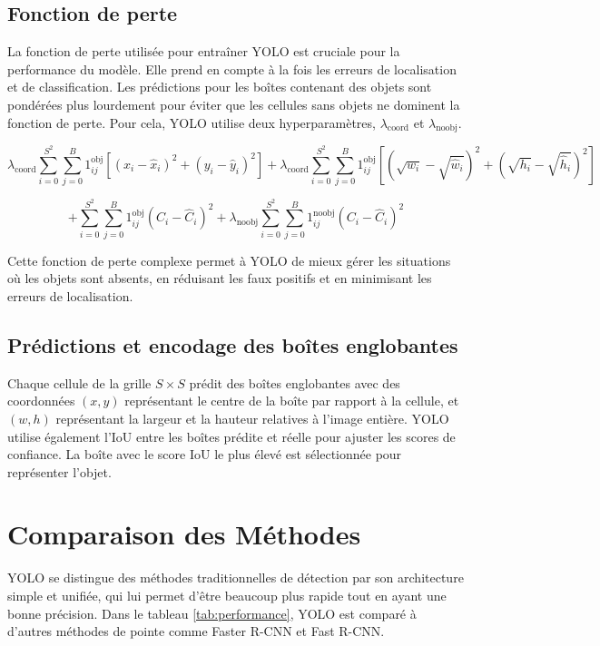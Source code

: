 \documentclass[a4paper,11pt]{article}
\begin{document}
\subsection{Fonction de perte}
La fonction de perte utilisée pour entraîner YOLO est cruciale pour la performance du modèle. Elle prend en compte à la fois les erreurs de localisation et de classification. Les prédictions pour les boîtes contenant des objets sont pondérées plus lourdement pour éviter que les cellules sans objets ne dominent la fonction de perte. Pour cela, YOLO utilise deux hyperparamètres, $\lambda_{\text{coord}}$ et $\lambda_{\text{noobj}}$.

\begin{equation}
\lambda_{\text{coord}} \sum_{i=0}^{S^2} \sum_{j=0}^{B} 1^{\text{obj}}_{ij} \left[(x_i - \hat{x}_i)^2 + (y_i - \hat{y}_i)^2\right] + \lambda_{\text{coord}} \sum_{i=0}^{S^2} \sum_{j=0}^{B} 1^{\text{obj}}_{ij} \left[\left(\sqrt{w_i} - \sqrt{\hat{w}_i}\right)^2 + \left(\sqrt{h_i} - \sqrt{\hat{h}_i}\right)^2 \right]
\end{equation}

\begin{equation}
+ \sum_{i=0}^{S^2} \sum_{j=0}^{B} 1^{\text{obj}}_{ij} \left(C_i - \hat{C}_i\right)^2 + \lambda_{\text{noobj}} \sum_{i=0}^{S^2} \sum_{j=0}^{B} 1^{\text{noobj}}_{ij} \left(C_i - \hat{C}_i\right)^2
\end{equation}

Cette fonction de perte complexe permet à YOLO de mieux gérer les situations où les objets sont absents, en réduisant les faux positifs et en minimisant les erreurs de localisation.

\subsection{Prédictions et encodage des boîtes englobantes}
Chaque cellule de la grille $S \times S$ prédit des boîtes englobantes avec des coordonnées $(x, y)$ représentant le centre de la boîte par rapport à la cellule, et $(w, h)$ représentant la largeur et la hauteur relatives à l'image entière. YOLO utilise également l'IoU entre les boîtes prédite et réelle pour ajuster les scores de confiance. La boîte avec le score IoU le plus élevé est sélectionnée pour représenter l'objet.

\section{Comparaison des Méthodes}
YOLO se distingue des méthodes traditionnelles de détection par son architecture simple et unifiée, qui lui permet d'être beaucoup plus rapide tout en ayant une bonne précision. Dans le tableau \ref{tab:performance}, YOLO est comparé à d'autres méthodes de pointe comme Faster R-CNN et Fast R-CNN.
\end{document}
